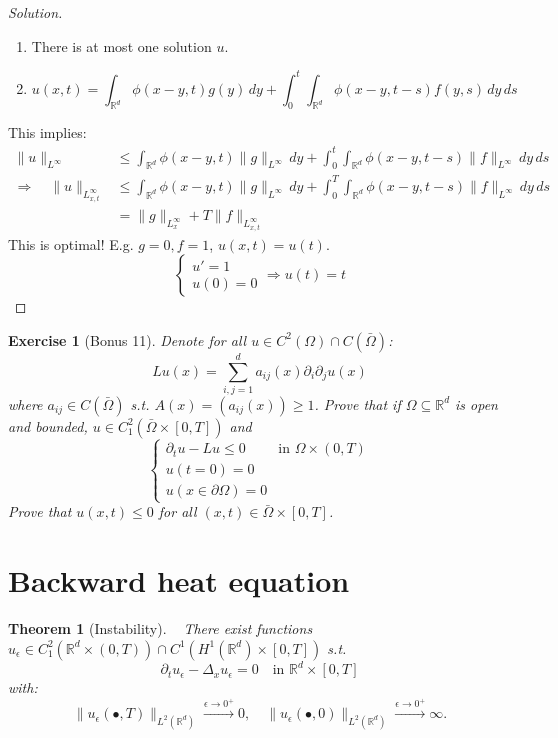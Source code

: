 \documentclass{report}
\theoremstyle{tommy}
\newtheorem{thm}[defn]{Theorem}
\newtheorem{ex}[defn]{Exercise}
\begin{document}
  \begin{proof}[Solution]\
    \begin{enumerate}[label=Step \arabic*:]
      \item There is at most one solution \(u\).
      \item \[u(x,t) = \int_{\mathbb{R}^d} \phi(x-y,t) g(y) \, dy + \int_0^t \int_{\mathbb{R}^d} \phi(x-y,t-s)f(y,s) \, dy \, ds\]
    \end{enumerate}
    This implies:
    \begin{align*}
      \|u\|_{L^\infty} &\le \int_{\mathbb{R}^d} \phi(x-y,t) \|g\|_{L^\infty} \, dy + \int_0^t \int_{\mathbb{R}^d} \phi(x-y,t-s) \|f\|_{L^\infty} \, dy \, ds  \\
      \Rightarrow \quad \|u\|_{L_{x,t}^\infty} &\le \int_{\mathbb{R}^d} \phi(x-y,t) \|g\|_{L^\infty} \, dy + \int_0^T \int_{\mathbb{R}^d} \phi(x-y,t-s) \|f\|_{L^\infty} \, dy \, ds \\
      &= \|g\|_{L_x^\infty} + T \|f\|_{L_{x,t}^\infty}
    \end{align*}
    This is optimal! E.g. \(g = 0, f = 1\), \(u(x,t) = u(t)\).
    \[\begin{cases}
      u' = 1 \\ u(0) =0
    \end{cases}\Rightarrow u(t) = t\]
  \end{proof}

  \begin{ex}[Bonus 11]
    Denote for all \(u \in C^2(\Omega) \cap C(\bar \Omega)\):
    \[Lu(x) = \sum_{i,j=1}^d a_{ij}(x) \partial_i \partial_j u(x)\]
    where \(a_{ij} \in C(\bar \Omega)\) s.t. \(A(x) = (a_{ij}(x)) \ge 1\).
    Prove that if \(\Omega \subseteq \mathbb{R}^d\) is open and bounded, \(u \in C_1^2(\bar \Omega \times [0,T])\) and 
    \[\begin{cases}
      \partial_t u - Lu \le 0 &\text{in } \Omega \times (0,T) \\
      u(t=0) = 0 \\ u(x \in \partial \Omega) = 0
    \end{cases}\]
    Prove that \(u(x,t) \le 0\) for all \((x,t) \in \bar \Omega \times [0,T]\).
  \end{ex}


  \section{Backward heat equation}
  \begin{thm}[Instability]\ \newline
    There exist functions \(u_\epsilon \in C_1^2(\mathbb{R}^d \times (0,T)) \cap C^1(H^1(\mathbb{R}^d) \times [0,T])\) s.t. \[\partial_t u_\epsilon - \Delta_x u_\epsilon = 0 \quad \text{in } \mathbb{R}^d \times [0,T]\]
		with:
		\[\|u_\epsilon(\bullet, T)\|_{L^2(\mathbb{R}^d)} \xrightarrow{\epsilon \to 0^+} 0, \quad \|u_\epsilon(\bullet, 0)\|_{L^2(\mathbb{R}^d)} \xrightarrow{\epsilon \to 0^+} \infty.\]
  \end{thm}
\end{document}
